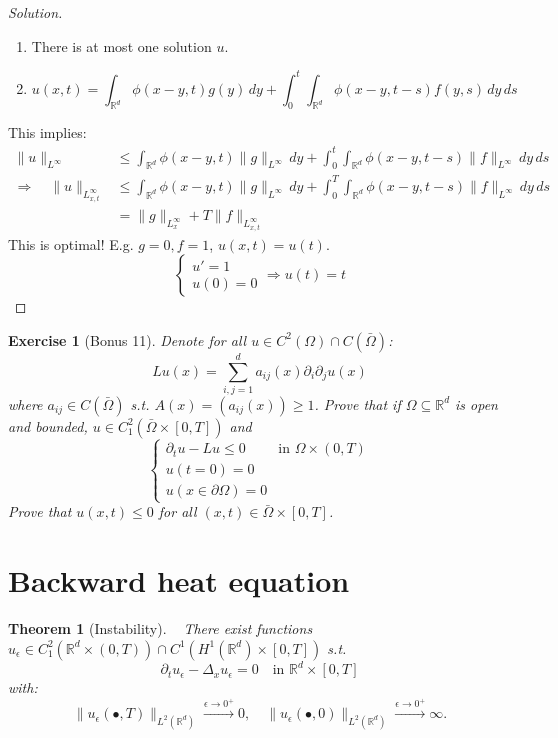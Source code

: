 \documentclass{report}
\theoremstyle{tommy}
\newtheorem{thm}[defn]{Theorem}
\newtheorem{ex}[defn]{Exercise}
\begin{document}
  \begin{proof}[Solution]\
    \begin{enumerate}[label=Step \arabic*:]
      \item There is at most one solution \(u\).
      \item \[u(x,t) = \int_{\mathbb{R}^d} \phi(x-y,t) g(y) \, dy + \int_0^t \int_{\mathbb{R}^d} \phi(x-y,t-s)f(y,s) \, dy \, ds\]
    \end{enumerate}
    This implies:
    \begin{align*}
      \|u\|_{L^\infty} &\le \int_{\mathbb{R}^d} \phi(x-y,t) \|g\|_{L^\infty} \, dy + \int_0^t \int_{\mathbb{R}^d} \phi(x-y,t-s) \|f\|_{L^\infty} \, dy \, ds  \\
      \Rightarrow \quad \|u\|_{L_{x,t}^\infty} &\le \int_{\mathbb{R}^d} \phi(x-y,t) \|g\|_{L^\infty} \, dy + \int_0^T \int_{\mathbb{R}^d} \phi(x-y,t-s) \|f\|_{L^\infty} \, dy \, ds \\
      &= \|g\|_{L_x^\infty} + T \|f\|_{L_{x,t}^\infty}
    \end{align*}
    This is optimal! E.g. \(g = 0, f = 1\), \(u(x,t) = u(t)\).
    \[\begin{cases}
      u' = 1 \\ u(0) =0
    \end{cases}\Rightarrow u(t) = t\]
  \end{proof}

  \begin{ex}[Bonus 11]
    Denote for all \(u \in C^2(\Omega) \cap C(\bar \Omega)\):
    \[Lu(x) = \sum_{i,j=1}^d a_{ij}(x) \partial_i \partial_j u(x)\]
    where \(a_{ij} \in C(\bar \Omega)\) s.t. \(A(x) = (a_{ij}(x)) \ge 1\).
    Prove that if \(\Omega \subseteq \mathbb{R}^d\) is open and bounded, \(u \in C_1^2(\bar \Omega \times [0,T])\) and 
    \[\begin{cases}
      \partial_t u - Lu \le 0 &\text{in } \Omega \times (0,T) \\
      u(t=0) = 0 \\ u(x \in \partial \Omega) = 0
    \end{cases}\]
    Prove that \(u(x,t) \le 0\) for all \((x,t) \in \bar \Omega \times [0,T]\).
  \end{ex}


  \section{Backward heat equation}
  \begin{thm}[Instability]\ \newline
    There exist functions \(u_\epsilon \in C_1^2(\mathbb{R}^d \times (0,T)) \cap C^1(H^1(\mathbb{R}^d) \times [0,T])\) s.t. \[\partial_t u_\epsilon - \Delta_x u_\epsilon = 0 \quad \text{in } \mathbb{R}^d \times [0,T]\]
		with:
		\[\|u_\epsilon(\bullet, T)\|_{L^2(\mathbb{R}^d)} \xrightarrow{\epsilon \to 0^+} 0, \quad \|u_\epsilon(\bullet, 0)\|_{L^2(\mathbb{R}^d)} \xrightarrow{\epsilon \to 0^+} \infty.\]
  \end{thm}
\end{document}
